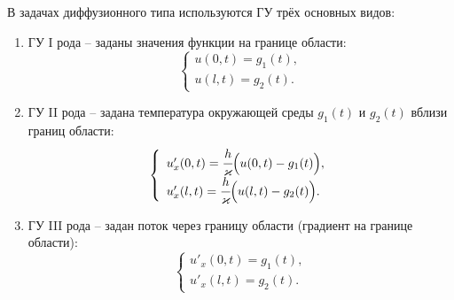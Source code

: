 
В задачах диффузионного типа используются ГУ трёх основных видов:
\begin{enumerate}
    \item ГУ I рода -- заданы значения функции на границе области:
    \[
        \left\{ \begin{array}{l}
            u(0, t) = g_1(t), \\
            u(l, t) = g_2(t).
        \end{array} \right.
    \]
    
    \item ГУ II рода -- задана температура окружающей среды \( g_1(t) \) и
    \( g_2(t) \) вблизи границ области:
    \[
        \left\{ \begin{array}{l}
            u'_x(0, t) = \cfrac{h}{\kappa}\Big(u(0, t) - g_1(t)\Big), \\
            u'_x(l, t) = \cfrac{h}{\kappa}\Big(u(l, t) - g_2(t)\Big).
        \end{array} \right.
    \]
    
    \item ГУ III рода -- задан поток через границу области (градиент на границе
    области):
    \[
        \left\{ \begin{array}{l}
            u'_x(0, t) = g_1(t), \\
            u'_x(l, t) = g_2(t).
        \end{array} \right.
    \]
\end{enumerate}

\newpage %

